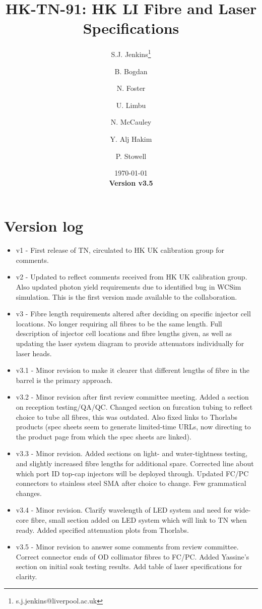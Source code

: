 \documentclass[a4paper,11pt]{article}
\begin{document}
\title{\huge{HK-TN-91: HK LI Fibre and Laser Specifications}}
\author[1]{S.J. Jenkins\footnote{s.j.jenkins@liverpool.ac.uk}}
\author[1]{B. Bogdan}
\author[1]{N. Foster}
\author[1]{U. Limbu}
\author[1]{N. McCauley}
\author[2]{Y. Alj Hakim}
\author[2]{P. Stowell}
\date{\today\\
{\bf Version v3.5}}

\maketitle

\tableofcontents

\newpage

\section{Version log}
\begin{itemize}
\item v1 - First release of TN, circulated to HK UK calibration group for comments.
\item v2 - Updated to reflect comments received from HK UK calibration group. Also updated photon yield requirements due to identified bug in WCSim simulation. This is the first version made available to the collaboration.
\item v3 - Fibre length requirements altered after deciding on specific injector cell locations. No longer requiring all fibres to be the same length. Full description of injector cell locations and fibre lengths given, as well as updating the laser system diagram to provide attenuators individually for laser heads.
\item v3.1 - Minor revision to make it clearer that different lengths of fibre in the barrel is the primary approach.
\item v3.2 - Minor revision after first review committee meeting. Added a section on reception testing/QA/QC. Changed section on furcation tubing to reflect choice to tube all fibres, this was outdated. Also fixed links to Thorlabs products (spec sheets seem to generate limited-time URLs, now directing to the product page from which the spec sheets are linked). 
\item v3.3 - Minor revision. Added sections on light- and water-tightness testing, and slightly increased fibre lengths for additional spare. Corrected line about which port ID top-cap injectors will be deployed through. Updated FC/PC connectors to stainless steel SMA after choice to change. Few grammatical changes.
\item v3.4 - Minor revision. Clarify wavelength of LED system and need for wide-core fibre, small section added on LED system which will link to TN when ready. Added specified attenuation plots from Thorlabs.
\item v3.5 - Minor revision to answer some comments from review committee. Correct connector ends of OD collimator fibres to FC/PC. Added Yassine's section on initial soak testing results. Add table of laser specifications for clarity.
\end{itemize}
\end{document}
